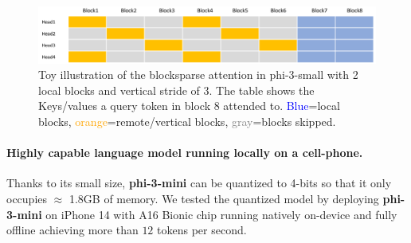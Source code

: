 \documentclass[11pt]{article}
\begin{document}
\begin{figure}[!h]
    \centering
    \includegraphics[scale=0.3]{figures/illustration-of-bs-attn.png}
    \caption{Toy illustration of the blocksparse attention in phi-3-small with 2 local blocks and vertical stride of 3. The table shows the Keys/values a query token in block 8 attended to. \textcolor{blue}{Blue}=local blocks, \textcolor{orange}{orange}=remote/vertical blocks, \textcolor{gray}{gray}=blocks skipped.}
    \label{fig:bs-atn-illustration}
\end{figure}

\paragraph{Highly capable language model running locally on a cell-phone.} Thanks to its small size, \textbf{phi-3-mini} can be quantized to 4-bits so that it only occupies $\approx$ 1.8GB of memory. We tested the quantized model by deploying \textbf{phi-3-mini} on iPhone 14 with A16 Bionic chip running natively on-device and fully offline achieving more than $12$ tokens per second.
\end{document}
